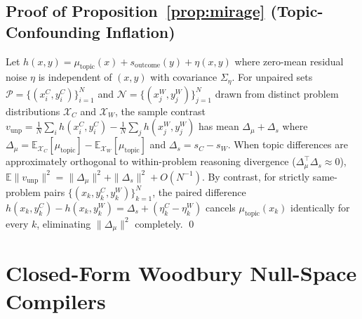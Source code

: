 \documentclass[10pt]{article}
\begin{document}
\subsection{Proof of Proposition~\ref{prop:mirage} (Topic-Confounding Inflation)}
Let $h(x, y) = \mu_{\mathrm{topic}}(x) + s_{\mathrm{outcome}}(y) + \eta(x,y)$ where zero-mean residual noise $\eta$ is independent of $(x,y)$ with covariance $\Sigma_\eta$. For unpaired sets $\mathcal{P} = \{(x_i^C, y_i^C)\}_{i=1}^N$ and $\mathcal{N} = \{(x_j^W, y_j^W)\}_{j=1}^N$ drawn from distinct problem distributions $\mathcal{X}_C$ and $\mathcal{X}_W$, the sample contrast $v_{\mathrm{unp}} = \frac{1}{N}\sum_i h(x_i^C, y_i^C) - \frac{1}{N}\sum_j h(x_j^W, y_j^W)$ has mean $\Delta_\mu + \Delta_s$ where $\Delta_\mu = \mathbb{E}_{\mathcal{X}_C}[\mu_{\mathrm{topic}}] - \mathbb{E}_{\mathcal{X}_W}[\mu_{\mathrm{topic}}]$ and $\Delta_s = s_C - s_W$. When topic differences are approximately orthogonal to within-problem reasoning divergence ($\Delta_\mu^\top \Delta_s \approx 0$), $\mathbb{E}\|v_{\mathrm{unp}}\|^2 = \|\Delta_\mu\|^2 + \|\Delta_s\|^2 + O(N^{-1})$. By contrast, for strictly same-problem pairs $\{(x_k, y_k^C, y_k^W)\}_{k=1}^N$, the paired difference $h(x_k, y_k^C) - h(x_k, y_k^W) = \Delta_s + (\eta_k^C - \eta_k^W)$ cancels $\mu_{\mathrm{topic}}(x_k)$ identically for every $k$, eliminating $\|\Delta_\mu\|^2$ completely. \qed

\section{Closed-Form Woodbury Null-Space Compilers}
\label{app:woodbury}
\end{document}
